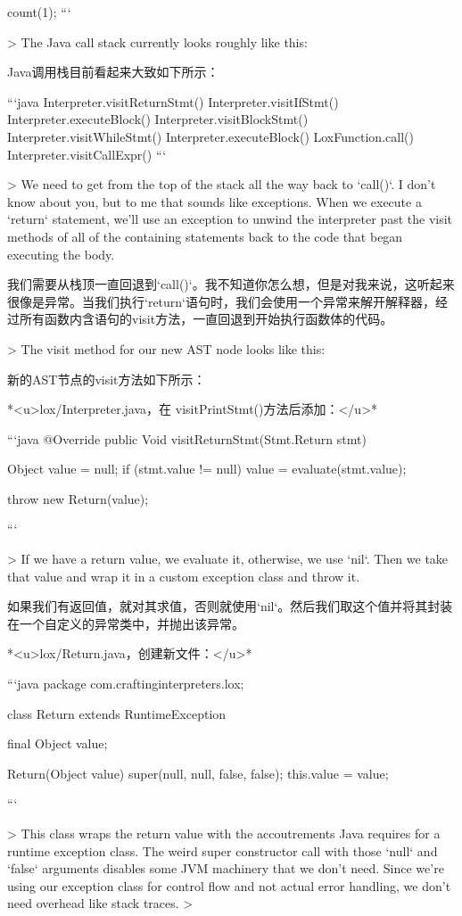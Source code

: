 \documentclass[cn,11pt,chinese]{elegantbook}
\begin{document}
{{{{{{{{count(1);
```

> The Java call stack currently looks roughly like this:

Java调用栈目前看起来大致如下所示：

```java
Interpreter.visitReturnStmt()
Interpreter.visitIfStmt()
Interpreter.executeBlock()
Interpreter.visitBlockStmt()
Interpreter.visitWhileStmt()
Interpreter.executeBlock()
LoxFunction.call()
Interpreter.visitCallExpr()
```

> We need to get from the top of the stack all the way back to `call()`. I don’t know about you, but to me that sounds like exceptions. When we execute a `return` statement, we’ll use an exception to unwind the interpreter past the visit methods of all of the containing statements back to the code that began executing the body.

我们需要从栈顶一直回退到`call()`。我不知道你怎么想，但是对我来说，这听起来很像是异常。当我们执行`return`语句时，我们会使用一个异常来解开解释器，经过所有函数内含语句的visit方法，一直回退到开始执行函数体的代码。

> The visit method for our new AST node looks like this:

新的AST节点的visit方法如下所示：

*<u>lox/Interpreter.java，在 visitPrintStmt()方法后添加：</u>*

```java
  @Override
  public Void visitReturnStmt(Stmt.Return stmt) {
    Object value = null;
    if (stmt.value != null) value = evaluate(stmt.value);

    throw new Return(value);
  }
```

> If we have a return value, we evaluate it, otherwise, we use `nil`. Then we take that value and wrap it in a custom exception class and throw it.

如果我们有返回值，就对其求值，否则就使用`nil`。然后我们取这个值并将其封装在一个自定义的异常类中，并抛出该异常。

*<u>lox/Return.java，创建新文件：</u>*

```java
package com.craftinginterpreters.lox;

class Return extends RuntimeException {
  final Object value;

  Return(Object value) {
    super(null, null, false, false);
    this.value = value;
  }
}
```

> This class wraps the return value with the accoutrements Java requires for a runtime exception class. The weird super constructor call with those `null` and `false` arguments disables some JVM machinery that we don’t need. Since we’re using our exception class for control flow and not actual error handling, we don’t need overhead like stack traces.
>

}}}}}}}}
\end{document}
